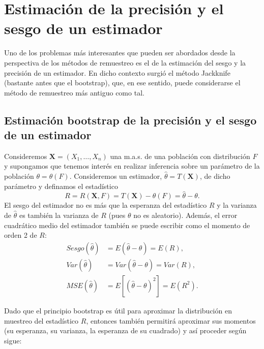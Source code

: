 \documentclass[
]{book}
\renewcommand{\mathbf}[1]{\symbf{#1}}
\theoremstyle{break}
\theoremstyle{nonumberplain}
\begin{document}
\chapter{Estimación de la precisión y el sesgo de un estimador}\label{prec-sesgo}

Uno de los problemas más interesantes que pueden ser abordados desde la
perspectiva de los métodos de remuestreo es el de la estimación del
sesgo y la precisión de un estimador. En dicho contexto surgió el método
Jackknife (bastante antes que el bootstrap), que, en ese sentido, puede
considerarse el método de remuestreo más antiguo como tal.

\section{Estimación bootstrap de la precisión y el sesgo de un estimador}\label{prec-sesgo-boot}

Consideremos \(\mathbf{X}=\left( X_1,\ldots ,X_n \right)\) una
m.a.s. de una población con distribución \(F\) y supongamos que tenemos
interés en realizar inferencia sobre un parámetro de la población
\(\theta =\theta \left( F \right)\). Consideremos un estimador,
\(\hat{\theta}=T\left( \mathbf{X} \right)\), de dicho parámetro y
definamos el estadístico
\[R=R\left( \mathbf{X}, F \right) = T\left( \mathbf{X} \right) 
- \theta \left( F \right) = \hat{\theta} - \theta.\]
El sesgo del estimador no es más que la esperanza del
estadístico \(R\) y la varianza de \(\hat{\theta}\) es también la varianza
de \(R\) (pues \(\theta\) no es aleatorio). Además, el error cuadrático
medio del estimador también se puede escribir como el momento de orden 2
de \(R\):
\[\begin{aligned}
Sesgo\left( \hat{\theta} \right) &= E\left( \hat{\theta}-\theta \right)
=E\left( R \right), \\
Var\left( \hat{\theta} \right) &= Var\left( \hat{\theta}-\theta \right)
=Var\left( R \right), \\
MSE\left( \hat{\theta} \right) &= E\left[ \left( \hat{\theta}-\theta \right)
^2\right] =E\left( R^2 \right).
\end{aligned}\]

Dado que el principio bootstrap es útil para aproximar la distribución
en muestreo del estadístico \(R\), entonces también permitirá aproximar
sus momentos (su esperanza, su varianza, la esperanza de su cuadrado) y
así proceder según sigue:
\end{document}
